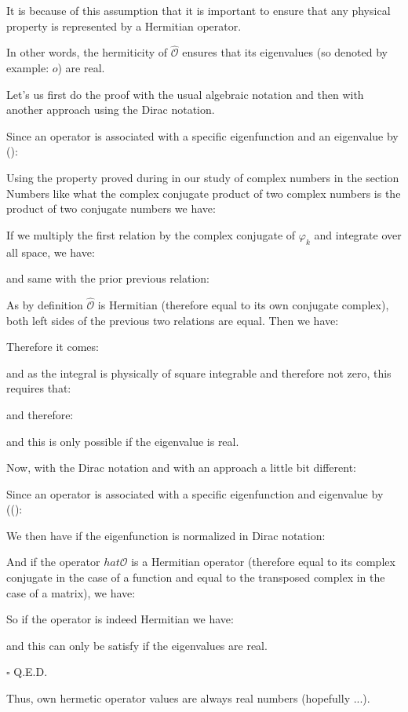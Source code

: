 	It is because of this assumption that it is important to ensure that any physical property is represented by a Hermitian operator. 
	\begin{theorem}
	In other words, the hermiticity of $\hat{\mathcal{O}}$ ensures that its eigenvalues (so denoted by example: $o$) are real.
	
	Let's us first do the proof with the usual algebraic notation and then with another approach using the Dirac notation.
	\end{theorem}
	\begin{dem}
	Since an operator is associated with a specific eigenfunction and an eigenvalue by ():
	
	Using the property proved during in our study of complex numbers in the section Numbers like what the complex conjugate product of two complex numbers is the product of two conjugate numbers we have:
		
	If we multiply the first relation by the complex conjugate of $\varphi_k$ and integrate over all space, we have:
	
	and same with the prior previous relation:
	
	As by definition $\hat{\mathcal{O}}$ is Hermitian (therefore equal to its own conjugate complex), both left sides of the previous two relations are equal. Then we have:
	
	Therefore it comes:
	
	and as the integral is physically of square integrable and therefore not zero, this requires that:
	
	and therefore:
	
	and this is only possible if the eigenvalue is real.
	
	Now, with the Dirac notation and with an approach a little bit different:
	
	Since an operator is associated with a specific eigenfunction and eigenvalue by (():
	
	We then have if the eigenfunction is normalized in Dirac notation:
	
	And if the operator $hat{\mathcal{O}}$ is a Hermitian operator (therefore equal to its complex conjugate in the case of a function and equal to the transposed complex in the case of a matrix), we have:
	
	So if the operator is indeed Hermitian we have:
	
	and this can only be satisfy if the eigenvalues are real.
	\begin{flushright}
		$\square$  Q.E.D.
	\end{flushright}
	\end{dem}
	Thus, own hermetic operator values are always real numbers (hopefully ...).
	
